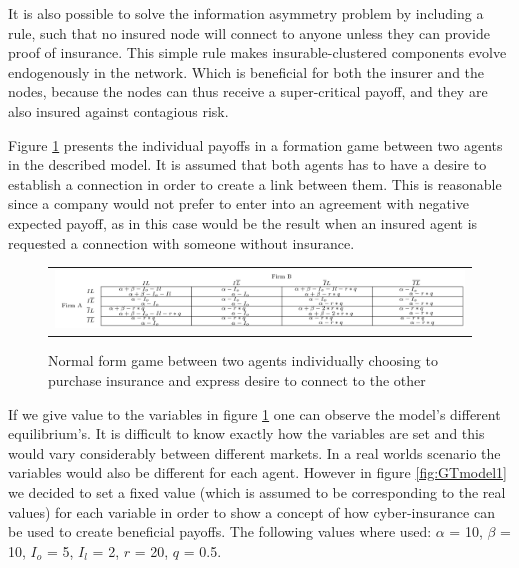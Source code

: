 It is also possible to solve the information asymmetry problem by including a rule, such that no insured node will connect to anyone unless they can provide proof of insurance. This simple rule makes insurable-clustered components  evolve endogenously in the network. Which is beneficial for both the insurer and the nodes, because the nodes can thus receive a super-critical payoff, and they are also insured against contagious risk.  

Figure \ref{fig:GTmodel1equations} presents the individual payoffs in a formation game between two agents in the described model. It is assumed that both agents has to have a desire to establish a connection in order to create a link between them. This is reasonable since a company would not prefer to enter into an agreement with negative expected payoff, as in this case would be the result when an insured agent is requested a connection with someone without insurance. 
 
 
\begin{figure}[h]
\centering
\begin{tabular}{@{}c@{}}
\includegraphics[width=1.0\textwidth]{../Figures/gameTheoryModel1WithEquations.png}
\end{tabular}
\caption[Caption for LOF]{\label{fig:GTmodel1equations} Normal form game between two agents individually choosing to purchase insurance and express desire to connect to the other  \footnotemark }
\end{figure}

If we give value to the variables in figure \ref{fig:GTmodel1equations} one can observe the model's different equilibrium's. It is difficult to know exactly how the variables are set and this would vary considerably between different markets. In a real worlds scenario the variables would also be different for each agent. However in figure \ref{fig:GTmodel1} we decided to set a fixed value (which is assumed to be corresponding to the real values) for each variable in order to show a concept of how cyber-insurance can be used to create beneficial payoffs.
The following values where used: $\alpha$ = 10, $\beta$ = 10, $I_{o}$ = 5, $I_{l}$ = 2, $r$  = 20, $q$ = 0.5.


